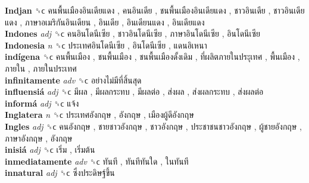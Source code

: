 \textbf{Indjan} ␝ϲ   คนพื้นเมืองอินเดียแดง ,  คนอินเดีย ,  ชนพื้นเมืองอินเดียแดง ,  ชาวอินเดีย ,  ชาวอินเดียแดง ,  ภาษาอเมริกันอินเดียน ,  อินเดีย ,  อินเดียนแดง ,  อินเดียแดง   \\
\textbf{Indones} \emph{adj}  ␝ϲ   คนอินโดนีเซีย ,  ชาวอินโดนีเซีย ,  ภาษาอินโดนีเซีย ,  อินโดนีเซีย   \\
\textbf{Indonesia} \emph{n}  ␝ϲ   ประเทศอินโดนีเซีย ,  อินโดนีเซีย ,  แดนอิเหนา   \\
\textbf{indígena} ␝ϲ   คนพื้นเมือง ,  ชนพื้นเมือง ,  ชนพื้นเมืองดั้งเดิม ,  ที่ผลิตภายในประุเทศ ,  พื้นเมือง ,  ภายใน ,  ภายในประเทศ   \\
\textbf{infinitamente} \emph{adv}  ␝ϲ   อย่างไม่มีที่สิ้นสุด   \\
\textbf{influensiá} \emph{adj}  ␝ϲ   มีผล ,  มีผลกระทบ ,  มีผลต่อ ,  ส่งผล ,  ส่งผลกระทบ ,  ส่งผลต่อ   \\
\textbf{informá} \emph{adj}  ␝ϲ   แจ้ง   \\
\textbf{Inglatera} \emph{n}  ␝ϲ   ประเทศอังกฤษ ,  อังกฤษ ,  เมืองผู้ดีอังกฤษ   \\
\textbf{Ingles} \emph{adj}  ␝ϲ   คนอังกฤษ ,  ชายชาวอังกฤษ ,  ชาวอังกฤษ ,  ประชาชนชาวอังกฤษ ,  ผู้ชายอังกฤษ ,  ภาษาอังกฤษ ,  อังกฤษ   \\
\textbf{inisiá} \emph{adj}  ␝ϲ   เริ่ม ,  เริ่มต้น   \\
\textbf{inmediatamente} \emph{adv}  ␝ϲ   ทันที ,  ทันทีทันใด ,  ในทันที   \\
\textbf{innatural} \emph{adj}  ␝ϲ   ซึ่งประดิษฐ์ขึ้น   \\
